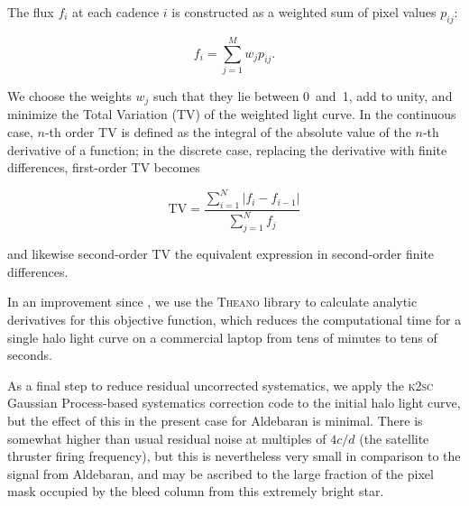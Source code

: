 \documentclass[modern]{aastex61}
\begin{document}
The flux $f_i$ at each cadence $i$ is constructed as a weighted sum of pixel values $p_{ij}$:

\begin{equation}
	f_i = \sum_{j=1}^{M} w_j p_{ij}.
\end{equation}

\noindent We choose the weights $w_j$ such that they lie between 0~and~1, add to unity, and minimize the Total Variation (TV) of the weighted light curve. In the continuous case, $n$-th order TV is defined as the integral of the absolute value of the $n$-th derivative of a function; in the discrete case, replacing the derivative with finite differences, first-order TV becomes

\begin{equation}
\text{TV} = \dfrac{\sum_{i=1}^{N} |{f}_i - {f}_{i-1}|}{\sum_{j=1}^{N} {f}_j}
\end{equation}

\noindent and likewise second-order TV the equivalent expression in second-order finite differences. 

In an improvement since \citet{White2017}, we use the \textsc{Theano} library \citep{theano} to calculate analytic derivatives for this objective function, which reduces the computational time for a single halo light curve on a commercial laptop from tens of minutes to tens of seconds. 

As a final step to reduce residual uncorrected systematics, we apply the \textsc{k2sc} \citep{k2sc} Gaussian Process-based systematics correction code to the initial halo light curve, but the effect of this in the present case for Aldebaran is minimal.
There is somewhat higher than usual residual noise at multiples of $4 c/d$ (the satellite thruster firing frequency), but this is nevertheless very small in comparison to the signal from Aldebaran, and may be ascribed to the large fraction of the pixel mask occupied by the bleed column from this extremely bright star.




\end{document}
